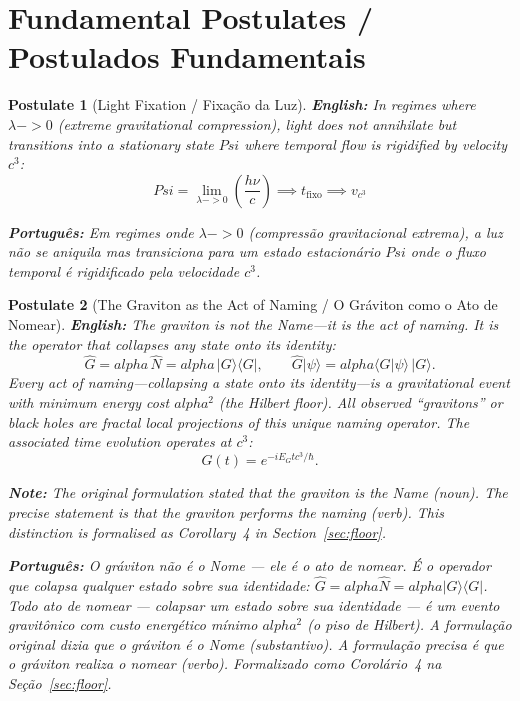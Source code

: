 \documentclass[12pt,a4paper]{article}
\newtheorem{postulate}{Postulate}
\def\Psi{Psi}%
\def\to{ -> }%
\def\alpha{alpha}%
\begin{document}
\section{Fundamental Postulates / Postulados Fundamentais}

\begin{postulate}[Light Fixation / Fixação da Luz]
\textbf{English:} In regimes where $\lambda \to 0$ (extreme gravitational compression), light does not annihilate but transitions into a stationary state $\Psi$ where temporal flow is rigidified by velocity $c^3$:
\begin{equation}
\Psi = \lim_{\lambda \to 0} \left(\frac{h\nu}{c}\right) \implies t_{\text{fixo}} \implies v_{c^3}
\end{equation}

\textbf{Português:} Em regimes onde $\lambda \to 0$ (compressão gravitacional extrema), a luz não se aniquila mas transiciona para um estado estacionário $\Psi$ onde o fluxo temporal é rigidificado pela velocidade $c^3$.
\end{postulate}

\begin{postulate}[The Graviton as the Act of Naming / O Gráviton como o Ato de Nomear]
\textbf{English:} The graviton is not the Name---it is the act of \emph{naming}. It is the operator that collapses any state onto its identity:
\begin{equation}
\hat{G} = \alpha\,\hat{N} = \alpha\,|G\rangle\langle G|, \qquad \hat{G}|\psi\rangle = \alpha\langle G|\psi\rangle\,|G\rangle.
\end{equation}
Every act of naming---collapsing a state onto its identity---is a gravitational event with minimum energy cost $\alpha^2$ (the Hilbert floor). All observed ``gravitons'' or black holes are fractal local projections of this unique naming operator. The associated time evolution operates at $c^3$:
\begin{equation}
G(t) = e^{-iE_G t c^3/\hbar}.
\end{equation}

\textbf{Note:} The original formulation stated that the graviton \emph{is} the Name (noun). The precise statement is that the graviton \emph{performs} the naming (verb). This distinction is formalised as Corollary~4 in Section~\ref{sec:floor}.

\textbf{Português:} O gráviton não é o Nome --- ele é o ato de \emph{nomear}. É o operador que colapsa qualquer estado sobre sua identidade: $\hat{G} = \alpha\hat{N} = \alpha|G\rangle\langle G|$. Todo ato de nomear --- colapsar um estado sobre sua identidade --- é um evento gravitônico com custo energético mínimo $\alpha^2$ (o piso de Hilbert). A formulação original dizia que o gráviton \emph{é} o Nome (substantivo). A formulação precisa é que o gráviton \emph{realiza} o nomear (verbo). Formalizado como Corolário~4 na Seção~\ref{sec:floor}.
\end{postulate}
\end{document}
